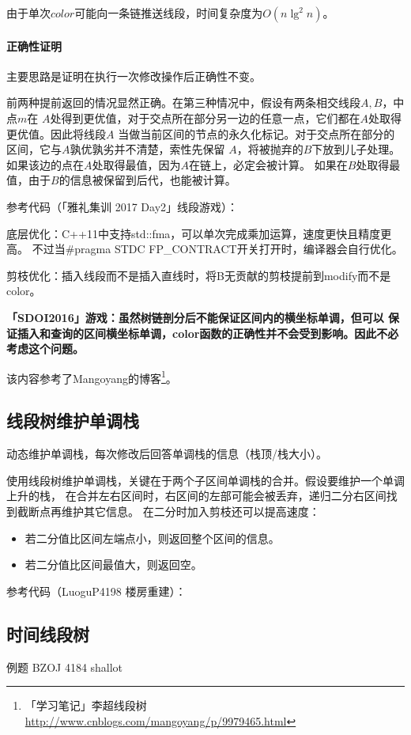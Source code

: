 由于单次$color$可能向一条链推送线段，时间复杂度为$O(n\lg^2 n)$。

\paragraph{正确性证明} 主要思路是证明在执行一次修改操作后正确性不变。

前两种提前返回的情况显然正确。在第三种情况中，假设有两条相交线段$A,B$，中点$m$在
$A$处得到更优值，对于交点所在部分另一边的任意一点，它们都在$A$处取得更优值。因此将线段$A$
当做当前区间的节点的永久化标记。对于交点所在部分的区间，它与$A$孰优孰劣并不清楚，索性先保留
$A$，将被抛弃的$B$下放到儿子处理。如果该边的点在$A$处取得最值，因为$A$在链上，必定会被计算。
如果在$B$处取得最值，由于$B$的信息被保留到后代，也能被计算。

参考代码（「雅礼集训 2017 Day2」线段游戏）：


底层优化：C++11中支持std::fma，可以单次完成乘加运算，速度更快且精度更高。
不过当\#pragma STDC FP\_CONTRACT开关打开时，编译器会自行优化。

剪枝优化：插入线段而不是插入直线时，将B无贡献的剪枝提前到modify而不是color。

{\bfseries 「SDOI2016」游戏：虽然树链剖分后不能保证区间内的横坐标单调，但可以
保证插入和查询的区间横坐标单调，color函数的正确性并不会受到影响。因此不必考虑这个问题。}

该内容参考了Mangoyang的博客\footnote{
    「学习笔记」李超线段树
    \url{http://www.cnblogs.com/mangoyang/p/9979465.html}
}。
\subsection{线段树维护单调栈}
动态维护单调栈，每次修改后回答单调栈的信息（栈顶/栈大小）。

使用线段树维护单调栈，关键在于两个子区间单调栈的合并。假设要维护一个单调上升的栈，
在合并左右区间时，右区间的左部可能会被丢弃，递归二分右区间找到截断点再维护其它信息。
在二分时加入剪枝还可以提高速度：
\begin{itemize}
    \item 若二分值比区间左端点小，则返回整个区间的信息。
    \item 若二分值比区间最值大，则返回空。
\end{itemize}

参考代码（LuoguP4198 楼房重建）：

\subsection{时间线段树}
例题 BZOJ 4184 shallot

